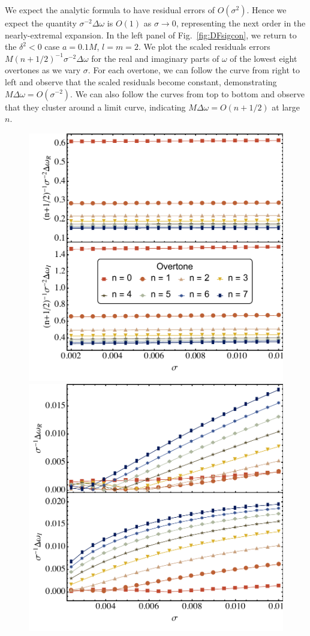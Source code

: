\begin{refsection}
We expect the analytic formula to have residual errors of $O(\sigma^2)$. 
Hence we expect the quantity $\sigma^{-2}\Delta \omega$ is $O(1)$ as $\sigma \to 0$, representing the next order in the nearly-extremal expansion. 
In the left panel of Fig.~\ref{fig:DFsigcon}, we return to the $\delta^2 <0$ case $a = 0.1M$, $l = m =2$. We plot the scaled residuals errors $M (n+1/2)^{-1}\sigma^{-2}\Delta \omega$ for the real and imaginary parts of $\omega$ of the lowest eight overtones as we vary $\sigma$.
For each overtone, we can follow the curve from right to left and observe that the scaled residuals become constant, demonstrating $M\Delta\omega = O(\sigma^{-2})$. 
We can also follow the curves from top to bottom and observe that they cluster around a limit curve, indicating $M\Delta \omega=O(n+1/2)$ at large $n$. 

\begin{figure}[tb]
\includegraphics[width =.8 \columnwidth]{chapter_extremal/etc/sigplot_a_1_s_0.pdf}
\includegraphics[width =.8 \columnwidth]{chapter_extremal/etc/sigplot_a_9_s_0.pdf} \\

\end{figure}
\end{refsection}

